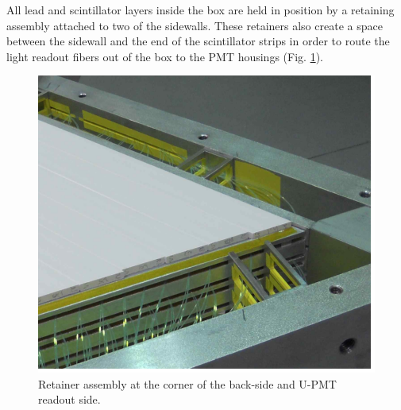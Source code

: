 All lead and scintillator layers inside the box are held in position by a retaining assembly attached to two of the sidewalls.  These retainers also create a space between the sidewall and the end of the scintillator strips in order to route the light readout fibers out of the box to the PMT housings (Fig. \ref{fig:S3_3}). 

\begin{figure}[hbt]
\centering
\includegraphics[width=0.95\columnwidth,keepaspectratio]{img/S3_6.png}
\caption[PCAL UVW Layers]{Retainer assembly at the corner of the back-side and U-PMT readout side.}
\label{fig:S3_3}
\end{figure}


